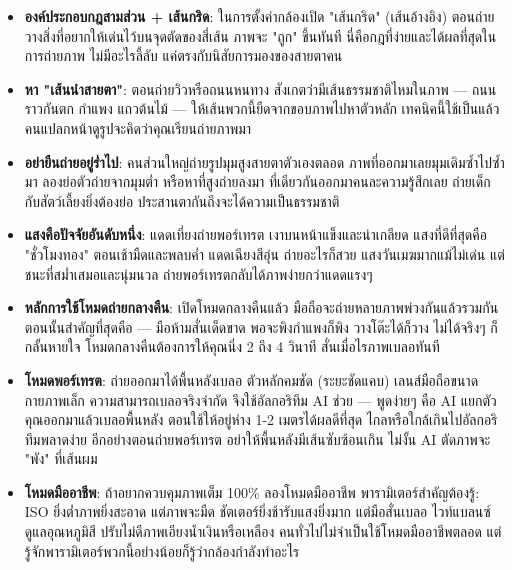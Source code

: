 \begin{itemize}
  \item \textbf{องค์ประกอบกฎสามส่วน + เส้นกริด}: ในการตั้งค่ากล้องเปิด "เส้นกริด" (เส้นอ้างอิง) ตอนถ่ายวางสิ่งที่อยากให้เด่นไว้บนจุดตัดของสี่เส้น ภาพจะ "ถูก" ขึ้นทันที นี่คือกฎที่ง่ายและได้ผลที่สุดในการถ่ายภาพ ไม่มีอะไรลี้ลับ แค่ตรงกับนิสัยการมองของสายตาคน
  \item \textbf{หา "เส้นนำสายตา"}: ตอนถ่ายวิวหรือถนนหนทาง สังเกตว่ามีเส้นธรรมชาติไหมในภาพ — ถนน ราวกันตก กำแพง แถวต้นไม้ — ให้เส้นพวกนี้ยืดจากขอบภาพไปหาตัวหลัก เทคนิคนี้ใช้เป็นแล้ว คนแปลกหน้าดูรูปจะคิดว่าคุณเรียนถ่ายภาพมา
  \item \textbf{อย่ายืนถ่ายอยู่ร่ำไป}: คนส่วนใหญ่ถ่ายรูปมุมสูงสายตาตัวเองตลอด ภาพที่ออกมาเลยมุมเดิมซ้ำไปซ้ำมา ลองย่อตัวถ่ายจากมุมต่ำ หรือหาที่สูงถ่ายลงมา ที่เดียวกันออกมาคนละความรู้สึกเลย ถ่ายเด็กกับสัตว์เลี้ยงยิ่งต้องย่อ ประสานตากันถึงจะได้ความเป็นธรรมชาติ
  \item \textbf{แสงคือปัจจัยอันดับหนึ่ง}: แดดเที่ยงถ่ายพอร์เทรต เงาบนหน้าแข็งและน่าเกลียด แสงที่ดีที่สุดคือ "ชั่วโมงทอง" ตอนเช้ามืดและพลบค่ำ แดดเฉียงสีอุ่น ถ่ายอะไรก็สวย แสงวันเมฆมากแม้ไม่เด่น แต่ชนะที่สม่ำเสมอและนุ่มนวล ถ่ายพอร์เทรตกลับได้ภาพง่ายกว่าแดดแรงๆ
  \item \textbf{หลักการใช้โหมดถ่ายกลางคืน}: เปิดโหมดกลางคืนแล้ว มือถือจะถ่ายหลายภาพพ่วงกันแล้วรวมกัน ตอนนั้นสำคัญที่สุดคือ — มือห้ามสั่นเด็ดขาด พอจะพิงกำแพงก็พิง วางโต๊ะได้ก็วาง ไม่ได้จริงๆ ก็กลั้นหายใจ โหมดกลางคืนต้องการให้คุณนิ่ง 2 ถึง 4 วินาที สั่นเมื่อไรภาพเบลอทันที
\end{itemize}


\begin{itemize}
  \item \textbf{โหมดพอร์เทรต}: ถ่ายออกมาได้พื้นหลังเบลอ ตัวหลักคมชัด (ระยะชัดแคบ) เลนส์มือถือขนาดกายภาพเล็ก ความสามารถเบลอจริงจำกัด จึงใช้อัลกอริทึม AI ช่วย — พูดง่ายๆ คือ AI แยกตัวคุณออกมาแล้วเบลอพื้นหลัง ตอนใช้ให้อยู่ห่าง 1-2 เมตรได้ผลดีที่สุด ไกลหรือใกล้เกินไปอัลกอริทึมพลาดง่าย อีกอย่างตอนถ่ายพอร์เทรต อย่าให้พื้นหลังมีเส้นซับซ้อนเกิน ไม่งั้น AI ตัดภาพจะ "พัง" ที่เส้นผม
  \item \textbf{โหมดมืออาชีพ}: ถ้าอยากควบคุมภาพเต็ม 100\% ลองโหมดมืออาชีพ พารามิเตอร์สำคัญต้องรู้: ISO ยิ่งต่ำภาพยิ่งสะอาด แต่ภาพจะมืด ชัตเตอร์ยิ่งช้ารับแสงยิ่งมาก แต่มือสั่นเบลอ ไวท์แบลนซ์ดูแลอุณหภูมิสี ปรับไม่ดีภาพเอียงน้ำเงินหรือเหลือง คนทั่วไปไม่จำเป็นใช้โหมดมืออาชีพตลอด แต่รู้จักพารามิเตอร์พวกนี้อย่างน้อยก็รู้ว่ากล้องกำลังทำอะไร
\end{itemize}

